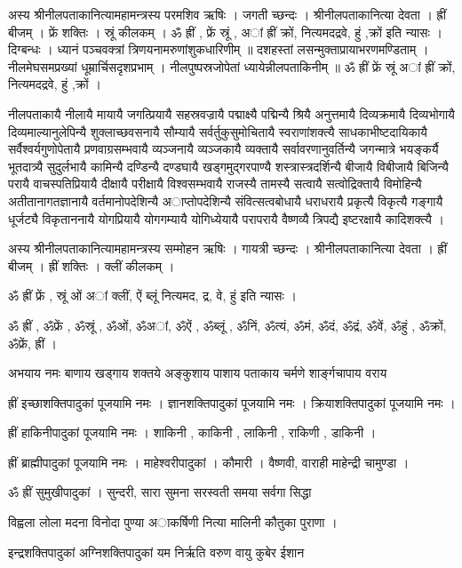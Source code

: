 अस्य श्रीनीलपताकानित्यामहामन्त्रस्य परमशिव ऋषिः । जगती च्छन्दः । श्रीनीलपताकानित्या देवता । ह्रीं बीजम् । फ्रें शक्तिः । स्रूं कीलकम् ।
ॐ ह्रीं , फ्रें स्रूं , अां ह्रीं क्रों, नित्यमदद्रवे, हुं ,क्रों  इति न्यासः । दिग्बन्धः ।
ध्यानं 
पञ्चवक्त्रां त्रिणयनामरुणांशुकधारिणीम् ॥ दशहस्तां लसन्मुक्ताप्रायाभरणमण्डिताम् ।
नीलमेघसमप्रख्यां धूम्रार्चिसदृशप्रभाम् । नीलपुष्पस्रजोपेतां ध्यायेन्नीलपताकिनीम् ॥
ॐ ह्रीं फ्रें स्रूं अां ह्रीं क्रों, नित्यमदद्रवे, हुं ,क्रों  ।

नीलपताकायै नीलायै मायायै जगत्प्रियायै सहस्रवज्रायै पद्माक्ष्यै पद्मिन्यै श्रियै अनुत्तमायै दिव्यक्रमायै दिव्यभोगायै दिव्यमाल्यानुलेपिन्यै शुक्लाच्छवसनायै सौम्यायै सर्वर्तुकुसुमोचितायै स्वराणांशक्त्यै साधकाभीष्टदायिकायै सर्वैश्वर्यगुणोपेतायै प्रणवाग्रसम्भवायै व्यञ्जनायै व्यञ्जकायै व्यक्तायै सर्वावरणानुवर्तिन्यै जगन्मात्रे भयङ्कर्यै भूतदात्र्यै सुदुर्लभायै कामिन्यै दण्डिन्यै दण्डघायै खड्गमुद्गरपाण्यै शस्त्रास्त्रदर्शिन्यै बीजायै विबीजायै बिजिन्यै परायै वाचस्पतिप्रियायै दीक्षायै परीक्षायै विश्वसम्भवायै राजस्यै तामस्यै सत्वायै सत्वोद्रिक्तायै विमोहिन्यै अतीतानागतज्ञानायै वर्तमानोपदेशिन्यै अाप्तोपदेशिन्यै संवित्सत्वबोधायै धराधरायै प्रकृत्यै विकृत्यै गङ्गायै धूर्जट्यै विकृताननायै योगप्रियायै योगगम्यायै योगिध्येयायै परापरायै वैष्णव्यै त्रिपद्यै इष्टरक्षायै कादिशक्त्यै ।

अस्य श्रीनीलपताकानित्यामहामन्त्रस्य सम्मोहन ऋषिः । गायत्री च्छन्दः । श्रीनीलपताकानित्या देवता । ह्रीं बीजम् । ह्रीं शक्तिः । क्लीं कीलकम् ।

ॐ ह्रीं फ्रें , स्रूं ओं अां क्लीं, ऐं ब्लूं  नित्यमद, द्र, वे, हुं  इति न्यासः ।

ॐ ह्रीं , ॐफ्रें , ॐस्रूं , ॐओं, ॐअां, ॐऐं , ॐब्लूं , ॐनिं, ॐत्यं, ॐमं, ॐदं, ॐद्रं, ॐवें, ॐहुं , ॐक्रों, ॐफ्रें, ह्रीं ।

अभयाय नमः बाणाय खड्गाय शक्तये  अङ्कुशाय पाशाय पताकाय चर्मणे शार्ङ्गचापाय वराय

ह्रीं इच्छाशक्तिपादुकां पूजयामि नमः । ज्ञानशक्तिपादुकां पूजयामि नमः । क्रियाशक्तिपादुकां पूजयामि नमः ।

ह्रीं हाकिनीपादुकां पूजयामि नमः । शाकिनी , काकिनी , लाकिनी , राकिणी , डाकिनी ।

ह्रीं ब्राह्मीपादुकां पूजयामि नमः । माहेश्वरीपादुकां । कौमारी । वैष्णवी, वाराही माहेन्द्री चामुण्डा ।

ॐ ह्रीं सुमुखीपादुकां । सुन्दरी, सारा सुमना सरस्वती समया सर्वगा सिद्धा 

विह्वला लोला मदना विनोदा पुण्या अाकर्षिणी नित्या मालिनी कौतुका  पुराणा ।

इन्द्रशक्तिपादुकां अग्निशक्तिपादुकां यम निर्ऋति वरुण वायु कुबेर ईशान 								

